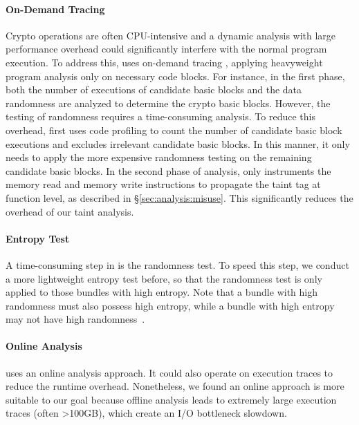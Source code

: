 \paragraph{On-Demand Tracing}
Crypto operations are often CPU-intensive and a dynamic analysis with large performance overhead could significantly interfere with the normal program execution. 
To address this, \sysname uses on-demand tracing , applying heavyweight program analysis only on necessary code blocks. 
For instance, in the first phase, both the number of executions of candidate basic blocks and the data randomness are analyzed to determine the crypto basic blocks. 
However, the testing of randomness requires a time-consuming analysis. 
To reduce this overhead, \sysname first uses code profiling to count the number of candidate basic block executions and excludes irrelevant candidate basic blocks. 
In this manner, it only needs to apply the more expensive randomness testing on the remaining candidate basic blocks. 
In the second phase of analysis, \sysname only instruments the memory read and memory write instructions to propagate the taint tag at function level, as described in \S\ref{sec:analysis:misuse}. This significantly reduces the overhead of our taint analysis.

\paragraph{Entropy Test}
A time-consuming step in \sysname is the randomness test.
To speed this step, we conduct a more lightweight entropy test before, so that the randomness test is only applied to those bundles with high entropy. 
Note that a bundle with high randomness must also possess high entropy, while a bundle with high entropy may not have high randomness~\cite{wang2013steal}.


\paragraph{Online Analysis}
\sysname uses an online analysis approach.
It could also operate on execution traces to reduce the runtime overhead. 
Nonetheless, we found an online approach is more suitable to our goal because offline analysis leads to extremely large execution traces (often >100GB), which create an I/O bottleneck slowdown.
